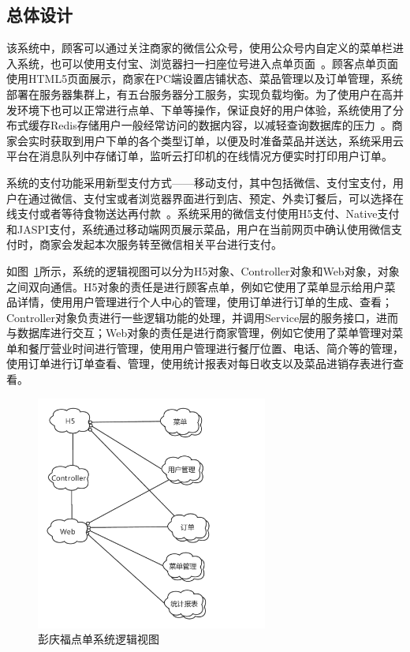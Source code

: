 \subsection{总体设计}
该系统中，顾客可以通过关注商家的微信公众号，使用公众号内自定义的菜单栏进入系统，也可以使用支付宝、浏览器扫一扫座位号进入点单页面~\cite{swain2019electrical}。顾客点单页面使用HTML5页面展示，商家在PC端设置店铺状态、菜品管理以及订单管理，系统部署在服务器集群上，有五台服务器分工服务，实现负载均衡。为了使用户在高并发环境下也可以正常进行点单、下单等操作，保证良好的用户体验，系统使用了分布式缓存Redis存储用户一般经常访问的数据内容，以减轻查询数据库的压力~\cite{zcy2013redis}。商家会实时获取到用户下单的各个类型订单，以便及时准备菜品并送达，系统采用云平台在消息队列中存储订单，监听云打印机的在线情况方便实时打印用户订单。

系统的支付功能采用新型支付方式——移动支付，其中包括微信、支付宝支付，用户在通过微信、支付宝或者浏览器界面进行到店、预定、外卖订餐后，可以选择在线支付或者等待食物送达再付款~\cite{wl2016}。系统采用的微信支付使用H5支付、Native支付和JASPI支付，系统通过移动端网页展示菜品，用户在当前网页中确认使用微信支付时，商家会发起本次服务转至微信相关平台进行支付。

如图~\ref{fig_logicCH3}所示，系统的逻辑视图可以分为H5对象、Controller对象和Web对象，对象之间双向通信。H5对象的责任是进行顾客点单，例如它使用了菜单显示给用户菜品详情，使用用户管理进行个人中心的管理，使用订单进行订单的生成、查看；Controller对象负责进行一些逻辑功能的处理，并调用Service层的服务接口，进而与数据库进行交互；Web对象的责任是进行商家管理，例如它使用了菜单管理对菜单和餐厅营业时间进行管理，使用用户管理进行餐厅位置、电话、简介等的管理，使用订单进行订单查看、管理，使用统计报表对每日收支以及菜品进销存表进行查看。

\begin{figure}[htbp!]
  \centering
  \includegraphics[width=3in]{FIGs/chapter3/logic.pdf}
  \caption{彭庆福点单系统逻辑视图}\label{fig_logicCH3}
\end{figure}

